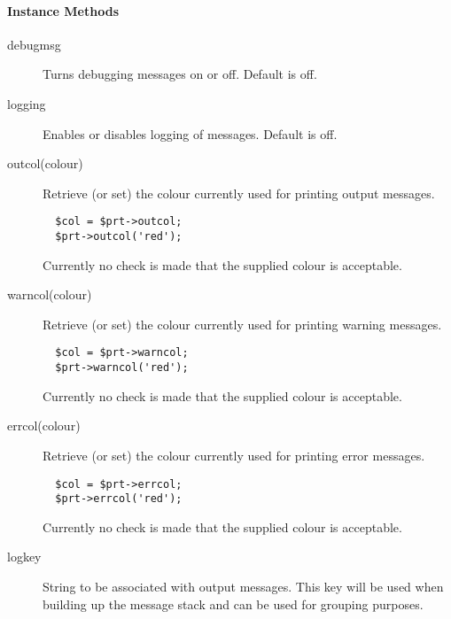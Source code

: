 \paragraph*{Instance Methods\label{ORAC::Print_Instance_Methods}}
\begin{description}

\item[{debugmsg}] \mbox{}

Turns debugging messages on or off. Default is off.


\item[{logging}] \mbox{}

Enables or disables logging of messages. Default is off.


\item[{outcol(colour)}] \mbox{}

Retrieve (or set) the colour currently used for printing output
messages.

\begin{verbatim}
  $col = $prt->outcol;
  $prt->outcol('red');
\end{verbatim}


Currently no check is made that the supplied colour is acceptable.


\item[{warncol(colour)}] \mbox{}

Retrieve (or set) the colour currently used for printing warning
messages.

\begin{verbatim}
  $col = $prt->warncol;
  $prt->warncol('red');
\end{verbatim}


Currently no check is made that the supplied colour is acceptable.


\item[{errcol(colour)}] \mbox{}

Retrieve (or set) the colour currently used for printing error
messages.

\begin{verbatim}
  $col = $prt->errcol;
  $prt->errcol('red');
\end{verbatim}


Currently no check is made that the supplied colour is acceptable.


\item[{logkey}] \mbox{}

String to be associated with output messages. This key will be used when
building up the message stack and can be used for grouping purposes.


\end{description}
